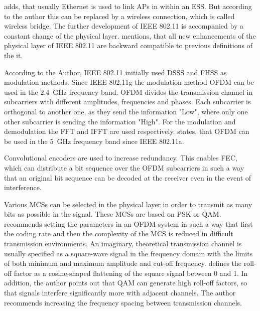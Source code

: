 \documentclass[]{nsm-thesis}
\begin{document}
\textcite{sauter_wireless_2022} adds, that usually Ethernet is used to link \ac{AP}s in within an \ac{ESS}. But according to the author this can be replaced by a wireless connection, which is called wireless bridge.
The further development of IEEE 802.11 is accompanied by a constant change of the physical layer. \textcite{sauter_wireless_2022} mentions, that all new enhancements of the physical layer of IEEE 802.11 are backward compatible to previous definitions of the it.

According to the Author, IEEE 802.11 initially used DSSS and FHSS as modulation methods.
Since IEEE 802.11g the modulation method \ac{OFDM} can be used in the \SI{2.4}{\giga\hertz} frequency band. \ac{OFDM} divides the transmission channel in subcarriers with different amplitudes, frequencies and phases. Each subcarrier is orthogonal to another one, as they send the information "Low", where only one other subcarrier is sending the information "High".
For the modulation and demodulation the FFT and IFFT are used respectively.
\textcite{kauffels_wireless_2002} states, that \ac{OFDM} can be used in the \SI{5}{\giga\hertz} frequency band since IEEE 802.11a.

Convolutional encoders are used to increase redundancy. This enables \ac{FEC}, which can distribute a bit sequence over the \ac{OFDM} subcarriers in such a way that an original bit sequence can be decoded at the receiver even in the event of interference. \textcite{kauffels_wireless_2002}


Various \ac{MCS}s can be selected in the physical layer in order to transmit as many bits as possible in the signal. 
These \ac{MCS}s are based on \ac{PSK} or \ac{QAM}. 
\textcite{kauffels_wireless_2002} recommends setting the parameters in an \ac{OFDM} system in such a way that first the coding rate and then the complexity of the \ac{MCS} is reduced in difficult transmission environments.
An imaginary, theoretical transmission channel is usually specified as a square-wave signal in the frequency domain with the limits of both minimum and maximum amplitude and cut-off frequency. \textcite{kauffels_wireless_2002} defines the roll-off factor as a cosine-shaped flattening of the square signal between 0 and 1. In addition, the author points out that \ac{QAM} can generate high roll-off factors, so that signals interfere significantly more with adjacent channels.
The author recommends increasing the frequency spacing between transmission channels.
\end{document}
